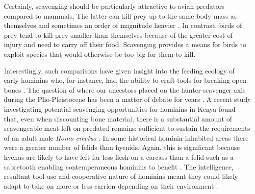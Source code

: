 \documentclass[a4paper,12pt]{article}
\begin{document}

Certainly, scavenging should be particularly attractive to avian predators compared to mammals. %
The latter can kill prey up to the same body mass as themselves and sometimes an order of magnitude heavier \citep[e.g. socially hunting lions; ][]{owen2008predator}.
In contrast, birds of prey tend to kill prey smaller than themselves \citep{slagsvold2007prey} because of the greater cost of injury and need to carry off their food.
Scavenging provides a means for birds to exploit species that would otherwise be too big for them to kill.



Interestingly, such comparisons have given insight into the feeding ecology of early hominins who, for instance, had the ability to craft tools for breaking open bones \citep{ARCM:ARCM12084}.
The question of where our ancestors placed on the hunter-scavenger axis during the Plio-Pleistocene has been a matter of debate for years \citep{dominguez2002hunting}.
A recent study investigating potential scavenging opportunities for hominins in Kenya found that, even when discounting bone material, there is a substantial amount of scavengeable meat left on predated remains; sufficient to sustain the requirements of an adult male \textit{Homo erectus} \citep{pobiner2015new}.
In some historical hominin-inhabited areas there were a greater number of felids than hyenids.
Again, this is significant because hyenas are likely to have left far less flesh on a carcass than a felid such as a sabretooth enabling contemperaneous hominins to benefit \citep{pobiner2015new}.
The intelligence, resultant tool-use and cooperative nature of hominins meant they could likely adapt to take on more or less carrion depending on their environment \citep{moleon2014humans}.
\end{document}
